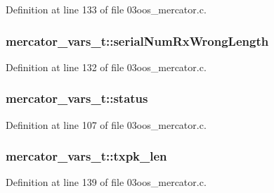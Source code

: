 Definition at line 133 of file 03oos\+\_\+mercator.\+c.

\subsubsection[{\texorpdfstring{serial\+Num\+Rx\+Wrong\+Length}{serialNumRxWrongLength}}]{ mercator\+\_\+vars\+\_\+t\+::serial\+Num\+Rx\+Wrong\+Length}\hypertarget{structmercator__vars__t_a6a352dc8bc425274d547f45236124bca}{}\label{structmercator__vars__t_a6a352dc8bc425274d547f45236124bca}


Definition at line 132 of file 03oos\+\_\+mercator.\+c.

\subsubsection[{\texorpdfstring{status}{status}}]{ mercator\+\_\+vars\+\_\+t\+::status}\hypertarget{structmercator__vars__t_aa7630f0959fd628fbd8e68210d6e9cbd}{}\label{structmercator__vars__t_aa7630f0959fd628fbd8e68210d6e9cbd}


Definition at line 107 of file 03oos\+\_\+mercator.\+c.

\subsubsection[{\texorpdfstring{txpk\+\_\+len}{txpk_len}}]{ mercator\+\_\+vars\+\_\+t\+::txpk\+\_\+len}\hypertarget{structmercator__vars__t_a742a3b68d766648bbb105b750862d78f}{}\label{structmercator__vars__t_a742a3b68d766648bbb105b750862d78f}


Definition at line 139 of file 03oos\+\_\+mercator.\+c.

